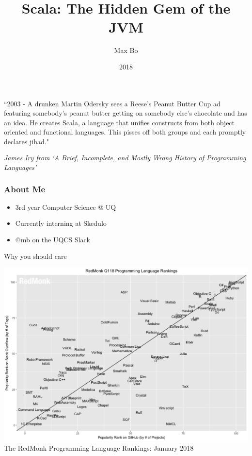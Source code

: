\documentclass{beamer}
\title{Scala: The Hidden Gem of the JVM}
\author{Max Bo}
\institute{UQCS}
\date{2018}
\begin{document}
 
\frame{\titlepage}
 
\begin{frame}

``2003 - A drunken Martin Odersky sees a Reese's Peanut Butter Cup ad featuring somebody's peanut butter getting on somebody else's chocolate and has an idea. He creates Scala, a language that unifies constructs from both object oriented and functional languages. This pisses off both groups and each promptly declares jihad."

    \textit{James Iry from `A Brief, Incomplete, and Mostly Wrong History of Programming Languages'}
\end{frame}

\begin{frame}
\frametitle{About Me}

\begin{itemize}
    \item 3rd year Computer Science @ UQ
    \item Currently interning at Skedulo
    \item @mb on the UQCS Slack
\end{itemize}

\end{frame}

\begin{frame}
    Why you should care
\end{frame}

\begin{frame}
    \includegraphics[width=\textwidth]{RedMonk.png}
    The RedMonk Programming Language Rankings: January 2018
\end{frame}
\end{document}
